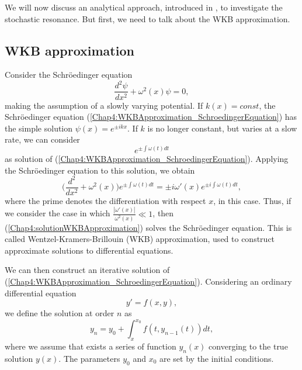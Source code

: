 \documentclass[11pt,a4paper,twoside]{book}
\begin{document}
We will now discuss an analytical approach, introduced in \cite{Chap4:LindePreheatingModel}, to investigate the stochastic resonance. But first, we need to talk about the WKB approximation.
\subsection{WKB approximation}
Consider the Schr\"{o}edinger equation
\begin{equation}
\label{Chap4:WKBApproximation_SchroedingerEquation}
\frac{d^{2}\psi}{dx^{2}} + \omega^{2}(x)\psi = 0,
\end{equation}
making the assumption of a slowly varying potential. If $ k(x)=const $, the Schr\"{o}edinger equation (\ref{Chap4:WKBApproximation_SchroedingerEquation}) has the simple solution $ \psi(x)=e^{\pm ikx} $. If $ k $ is no longer constant, but varies at a slow rate, we can consider 
\begin{equation}
	\label{Chap4:solutionWKBApproximation}
	e^{\pm \int \omega(t)dt}
\end{equation}
as solution of (\ref{Chap4:WKBApproximation_SchroedingerEquation}).
Applying the Schr\"{o}edinger equation to this solution, we obtain
\begin{equation}
\label{Chap4:SchroedingerApplied}
\Bigg(\dfrac{d^{2}}{dx^{2}} + \omega^{2}(x)\Bigg)e^{\pm \int \omega(t)dt} = \pm i\omega'(x)e^{\pm i \int \omega(t) dt},
\end{equation}
where the prime denotes the differentiation with respect $ x $, in this case.
Thus, if we consider the case in which $ \frac{|\omega'(x)|}{\omega^{2}(x)} \ll 1 $, then (\ref{Chap4:solutionWKBApproximation}) solves the Schr\"{o}edinger equation. This is called Wentzel-Kramers-Brillouin (WKB) approximation, used to construct  approximate solutions to differential equations.

We can then construct an iterative solution of (\ref{Chap4:WKBApproximation_SchroedingerEquation}). Considering an ordinary differential equation
\begin{equation}
y' = f(x,y),
\end{equation}
we define the solution at order $ n $ as 
\begin{equation}
	\label{Chap4:ConvergentSolutionInWKBApproximation}
	y_{n}=y_{0} + \int_{x}^{x_{0}} f(t,y_{n-1}(t))dt,
\end{equation}
where we assume that exists a series of function $ y_{n}(x) $ converging to the true solution $ y(x) $. The parameters $ y_{0} $ and $ x_{0} $ are set by the initial conditions.
\end{document}
